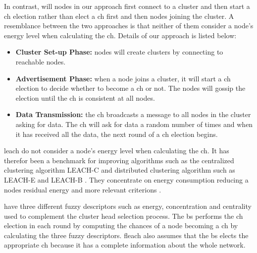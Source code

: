 \documentclass[USenglish]{uit-thesis}
\begin{document}
In contrast, will nodes in our approach first connect to a cluster and then start a \gls{ch} election rather than elect a \gls{ch} first and then nodes joining the cluster. %
A resemblance between the two approaches is that neither of them consider a node's energy level when calculating the \gls{ch}. Details of our approach is listed below:

\begin{itemize}
\item \textbf{Cluster Set-up Phase:} nodes will create clusters by connecting to reachable nodes.
\item \textbf{Advertisement Phase:} when a node joins a cluster, it will start a \gls{ch} election to decide whether to become a \gls{ch} or not. The nodes will gossip the election until the \gls{ch} is consistent at all nodes.
\item \textbf{Data Transmission:} the \gls{ch} broadcasts a message to all nodes in the cluster asking for data. The \gls{ch} will ask for data a random number of times and when it has received all the data, the next round of a \gls{ch} election begins.
\end{itemize}




\gls{leach} do not consider a node's energy level when calculating the \gls{ch}. It has therefor been a benchmark for improving algorithms such as the centralized clustering algorithm LEACH-C \cite {leach_c} and distributed clustering algorithm such as LEACH-E \cite{leach_e} and LEACH-B \cite{leach_b}. They concentrate on energy consumption reducing a nodes residual energy and more relevant criterions \cite{dec_cb_alg}.



 \cite{fuzzy_logic, ch_fuzzy} have three different fuzzy descriptors such as energy, concentration and centrality used to complement the cluster head selection process. The \gls{bs} performs the \gls{ch} election in each round by computing the chances of a node becoming a \gls{ch} by calculating the three fuzzy descriptors. \Gls{fleach} also assumes that the \gls{bs} elects the appropriate \gls{ch} because it has a complete information about the whole network.
\end{document}
